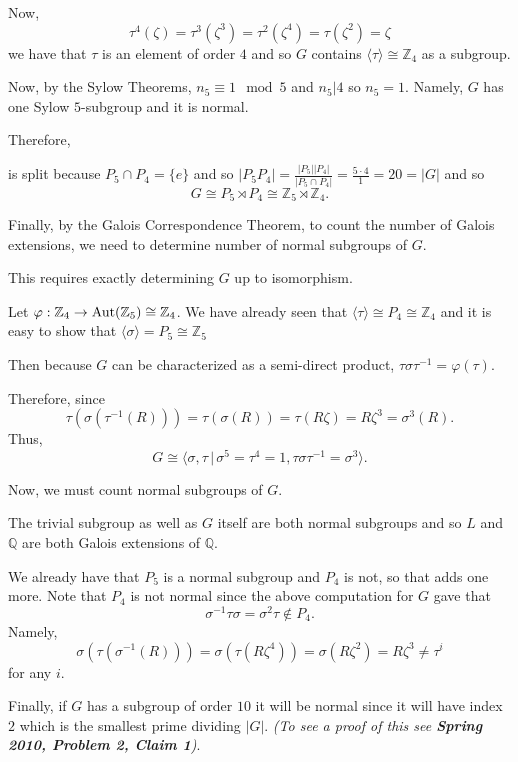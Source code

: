 \documentclass[12pt]{AlgebraQual}
\begin{document}
\begin{solution}
Now, $$\tau^4(\zeta)=\tau^3(\zeta^3)=\tau^2(\zeta^4)=\tau(\zeta^2)=\zeta$$ we have that $\tau$ is an element of order $4$ and so $G$ contains $\langle\tau\rangle\cong\mathbb{Z}_4$ as a subgroup.

Now, by the Sylow Theorems, $n_5\equiv 1\mod 5$ and $n_5|4$ so $n_5=1$. Namely, $G$ has one Sylow $5$-subgroup and it is normal.

Therefore, \begin{center}
\end{center}
is split because $P_5\cap P_4=\{e\}$ and so $|P_5P_4|=\frac{|P_5||P_4|}{|P_5\cap P_4|}=\frac{5\cdot 4}{1}=20=|G|$ and so $$G\cong P_5\rtimes P_4\cong\mathbb{Z}_5\rtimes\mathbb{Z}_4.$$

Finally, by the Galois Correspondence Theorem, to count the number of Galois extensions, we need to determine number of normal subgroups of $G$.

This requires exactly determining $G$ up to isomorphism.

Let $\varphi:\mathbb{Z}_4\to\text{Aut}(\mathbb{Z}_5)\cong\mathbb{Z}_4$. We have already seen that $\langle \tau\rangle\cong P_4\cong\mathbb{Z}_4$ and it is easy to show that $\langle \sigma\rangle=P_5\cong\mathbb{Z}_5$

Then because $G$ can be characterized as a semi-direct product, $\tau\sigma\tau^{-1}=\varphi(\tau).$

Therefore, since $$\tau(\sigma(\tau^{-1}(R)))=\tau(\sigma(R))=\tau(R\zeta)=R\zeta^3=\sigma^3(R).$$ Thus, $$G\cong\langle\sigma,\tau\,|\,\sigma^5=\tau^4=1,\tau\sigma\tau^{-1}=\sigma^3\rangle.$$

Now, we must count normal subgroups of $G.$

The trivial subgroup as well as $G$ itself are both normal subgroups and so $L$ and $\mathbb{Q}$ are both Galois extensions of $\mathbb{Q}$.

We already have that $P_5$ is a normal subgroup and $P_4$ is not, so that adds one more. Note that $P_4$ is not normal since the above computation for $G$ gave that $$\sigma^{-1}\tau\sigma=\sigma^2\tau\notin P_4.$$ Namely, $$\sigma(\tau(\sigma^{-1}(R)))=\sigma(\tau(R\zeta^4))=\sigma(R\zeta^2)=R\zeta^3\not=\tau^i$$ for any $i$.

Finally, if $G$ has a subgroup of order $10$ it will be normal since it will have index $2$ which is the smallest prime dividing $|G|.$ \textit{(To see a proof of this see \textbf{Spring 2010, Problem 2, Claim 1})}.


\end{solution}
\end{document}
